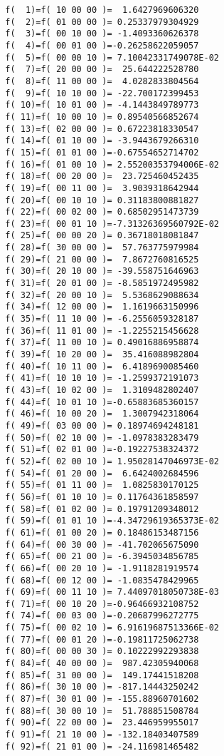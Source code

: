 \begin{footnotesize}
\begin{verbatim}
  f(  1)=f( 10 00 00 )=  1.6427969606320
  f(  2)=f( 01 00 00 )= 0.25337979304929
  f(  3)=f( 00 10 00 )= -1.4093360626378
  f(  4)=f( 00 01 00 )=-0.26258622059057
  f(  5)=f( 00 00 10 )= 7.10042331749078E-02
  f(  7)=f( 20 00 00 )=  25.644222528780
  f(  8)=f( 11 00 00 )=  4.0282833804564
  f(  9)=f( 10 10 00 )= -22.700172399453
  f( 10)=f( 10 01 00 )= -4.1443849789773
  f( 11)=f( 10 00 10 )= 0.89540566852674
  f( 13)=f( 02 00 00 )= 0.67223818330547
  f( 14)=f( 01 10 00 )= -3.9443679266310
  f( 15)=f( 01 01 00 )=-0.67554652714702
  f( 16)=f( 01 00 10 )= 2.55200353794006E-02
  f( 18)=f( 00 20 00 )=  23.725460452435
  f( 19)=f( 00 11 00 )=  3.9039318642944
  f( 20)=f( 00 10 10 )= 0.31183800881827
  f( 22)=f( 00 02 00 )= 0.68502951473739
  f( 23)=f( 00 01 10 )=-7.31326369560792E-02
  f( 25)=f( 00 00 20 )= 0.36718018081847
  f( 28)=f( 30 00 00 )=  57.763775979984
  f( 29)=f( 21 00 00 )=  7.8672760816525
  f( 30)=f( 20 10 00 )= -39.558751646963
  f( 31)=f( 20 01 00 )= -8.5851972495982
  f( 32)=f( 20 00 10 )=  5.5368629088634
  f( 34)=f( 12 00 00 )=  1.1619663150996
  f( 35)=f( 11 10 00 )= -6.2556059328187
  f( 36)=f( 11 01 00 )= -1.2255215456628
  f( 37)=f( 11 00 10 )= 0.49016886958874
  f( 39)=f( 10 20 00 )=  35.416088982804
  f( 40)=f( 10 11 00 )=  6.4189690085460
  f( 41)=f( 10 10 10 )= -1.2599372191073
  f( 43)=f( 10 02 00 )=  1.3109482802407
  f( 44)=f( 10 01 10 )=-0.65883685360157
  f( 46)=f( 10 00 20 )=  1.3007942318064
  f( 49)=f( 03 00 00 )= 0.18974694248181
  f( 50)=f( 02 10 00 )= -1.0978383283479
  f( 51)=f( 02 01 00 )=-0.19227538324372
  f( 52)=f( 02 00 10 )= 1.95028147046973E-02
  f( 54)=f( 01 20 00 )=  6.6424002684596
  f( 55)=f( 01 11 00 )=  1.0825830170125
  f( 56)=f( 01 10 10 )= 0.11764361858597
  f( 58)=f( 01 02 00 )= 0.19791209348012
  f( 59)=f( 01 01 10 )=-4.34729619365373E-02
  f( 61)=f( 01 00 20 )= 0.18486153487156
  f( 64)=f( 00 30 00 )= -41.702065675090
  f( 65)=f( 00 21 00 )= -6.3945034856785
  f( 66)=f( 00 20 10 )= -1.9118281919574
  f( 68)=f( 00 12 00 )= -1.0835478429965
  f( 69)=f( 00 11 10 )= 7.44097018050738E-03
  f( 71)=f( 00 10 20 )=-0.96466932108752
  f( 74)=f( 00 03 00 )=-0.20687996272775
  f( 75)=f( 00 02 10 )= 6.91619687513366E-02
  f( 77)=f( 00 01 20 )=-0.19811725062738
  f( 80)=f( 00 00 30 )= 0.10222992293838
  f( 84)=f( 40 00 00 )=  987.42305940068
  f( 85)=f( 31 00 00 )=  149.17441518208
  f( 86)=f( 30 10 00 )= -817.14443250242
  f( 87)=f( 30 01 00 )= -155.88960701602
  f( 88)=f( 30 00 10 )=  51.788851508784
  f( 90)=f( 22 00 00 )=  23.446959955017
  f( 91)=f( 21 10 00 )= -132.18403407589
  f( 92)=f( 21 01 00 )= -24.116981465482

\end{verbatim}
\end{footnotesize}
